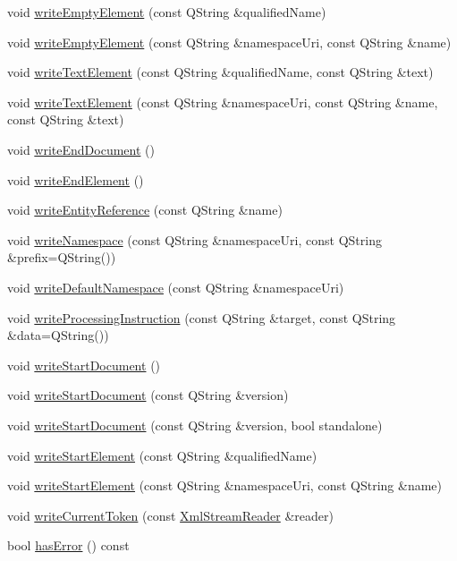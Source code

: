 \begin{DoxyCompactItemize}
void \hyperlink{class_xml_stream_writer_a07e058f896327e9236e7c19132842cf2}{write\+Empty\+Element} (const Q\+String \&qualified\+Name)
\item 
void \hyperlink{class_xml_stream_writer_ad366e97aa66482054f029843bc982586}{write\+Empty\+Element} (const Q\+String \&namespace\+Uri, const Q\+String \&name)
\item 
void \hyperlink{class_xml_stream_writer_a3c1e28db26255b0a88745ac76e84485e}{write\+Text\+Element} (const Q\+String \&qualified\+Name, const Q\+String \&text)
\item 
void \hyperlink{class_xml_stream_writer_a378c2645f837b9ea5786648285d4d6f4}{write\+Text\+Element} (const Q\+String \&namespace\+Uri, const Q\+String \&name, const Q\+String \&text)
\item 
void \hyperlink{class_xml_stream_writer_a4fa078ed52892cec544e890efb1c3b50}{write\+End\+Document} ()
\item 
void \hyperlink{class_xml_stream_writer_add89e8f61a141e2b320cf2b567e7edfb}{write\+End\+Element} ()
\item 
void \hyperlink{class_xml_stream_writer_aeea05577f7ecd0eaa34b4237fdbe446d}{write\+Entity\+Reference} (const Q\+String \&name)
\item 
void \hyperlink{class_xml_stream_writer_ae04b7c7035435fd98cc625257776e732}{write\+Namespace} (const Q\+String \&namespace\+Uri, const Q\+String \&prefix=Q\+String())
\item 
void \hyperlink{class_xml_stream_writer_ad545600b4e2c9d73ad9e216a20ff081e}{write\+Default\+Namespace} (const Q\+String \&namespace\+Uri)
\item 
void \hyperlink{class_xml_stream_writer_a5b31ab7e5667538264c8d8fa8de79eda}{write\+Processing\+Instruction} (const Q\+String \&target, const Q\+String \&data=Q\+String())
\item 
void \hyperlink{class_xml_stream_writer_ae9d5ccf2e94485352e4c1c8843dc0641}{write\+Start\+Document} ()
\item 
void \hyperlink{class_xml_stream_writer_affda139fb2d91c8893615b6ca6b9570a}{write\+Start\+Document} (const Q\+String \&version)
\item 
void \hyperlink{class_xml_stream_writer_af7df556ca625050ceba8041b9e71654b}{write\+Start\+Document} (const Q\+String \&version, bool standalone)
\item 
void \hyperlink{class_xml_stream_writer_aa001c660c1df012b4e37773aa219c379}{write\+Start\+Element} (const Q\+String \&qualified\+Name)
\item 
void \hyperlink{class_xml_stream_writer_ab8d06c59d1684e88d2bd820c72baf7bc}{write\+Start\+Element} (const Q\+String \&namespace\+Uri, const Q\+String \&name)
\item 
void \hyperlink{class_xml_stream_writer_ad3fc36a8359435e85bb0fa85dc785d70}{write\+Current\+Token} (const \hyperlink{class_xml_stream_reader}{Xml\+Stream\+Reader} \&reader)
\item 
bool \hyperlink{class_xml_stream_writer_a8a336415622c257d2df545b088e38eef}{has\+Error} () const
\end{DoxyCompactItemize}


